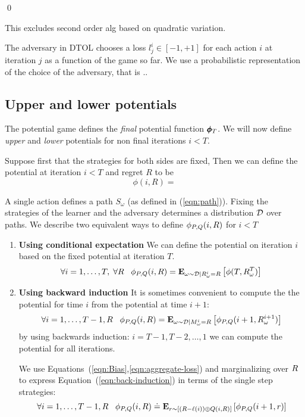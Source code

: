 \documentclass{article}[12pt]
\begin{document}
\proof
\qed

This excludes second order alg based on quadratic variation.


The adversary in DTOL chooses a loss $l_j^i \in [-1,+1]$ for each action $i$ at
iteration $j$ as a function of the game so far. We use a probabilistic
representation of the choice of the adversary, that is ..

\subsection{Upper and lower potentials} \label{sec:potentialRecursion}

The potential game defines the {\em final} potential function
$\pmb{\phi}_{T}$. We will now define {\em upper} and {\em lower}
potentials for non final iterations $i < T$.

Suppose first that the strategies for both sides are fixed,  Then we
can define the potential at iteration $i<T$ and regret $R$ to be
\[
\phi(i,R) = 
\]

 A single action defines a path $S_\omega$ (as defined in (\ref{eqn:path})). Fixing
 the strategies of the learner and the adversary determines
 a distribution ${\cal D}$ over paths.
We describe two equivalent ways to define $\phi_{P,Q}(i,R)$ for $i<T$
 \begin{enumerate}
 \item{\bf Using conditional expectation} We can define the potential
   on iteration $i$ based on the fixed potential at iteration $T$.
\begin{equation}
  \forall i=1,\ldots,T,\; \forall R \;\;\;
  \phi_{P,Q}(i,R)={\bf E}_{\omega\sim {\cal D}|R_\omega^i=R}\left[ \phi(T,R_{\omega}^T) \right]
\end{equation}
 \item{\bf Using backward induction} It is sometimes convenient to
   compute the the potential for time $i$ from the potential at time
   $i+1$:
   \begin{equation} \label{eqn:back-induction}
     \forall i=1,\ldots,T-1, R\;\;\;
     \phi_{P,Q}(i,R)={\bf E}_{\omega\sim {\cal D}|M_\omega^i=R}\left[ \phi_{P,Q}(i+1,R_{\omega}^{i+1}) \right]
   \end{equation}
by using backwards induction: $i=T-1,T-2,\ldots,1$ we can compute the
potential for all iterations.


We use Equations~(\ref{eqn:Bias},\ref{eqn:aggregate-loss}) and
marginalizing over $R$ to express Equation~(\ref{eqn:back-induction})
in terms of the single step strategies:
\begin{equation} \label{eqn:induction}
  \forall i=1,\ldots,T-1, R\;\;\;
  \phi_{P,Q}(i,R) \doteq {\bf E}_{r \sim [(R-\ell(i)) \oplus Q(i,R)]}\left[ \phi_{P,Q}(i+1,r) \right]
\end{equation}

\end{enumerate}
\end{document}
